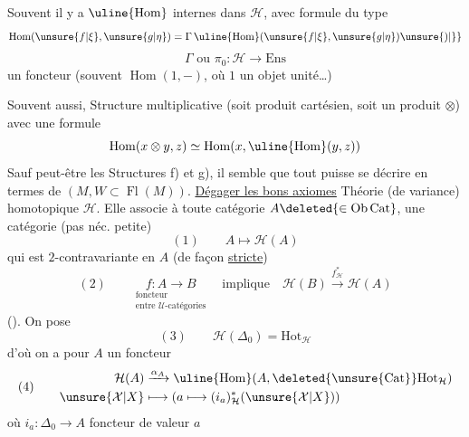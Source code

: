 Souvent il y a  $\uline{\operatorname{Hom}}$ internes
dans $\mathcal H$, avec  formule du type
\[
\operatorname{Hom}(\unsure{f|\xi},\unsure{g|\eta})
=\Gamma\,\uline{\operatorname{Hom}}(\unsure{f|\xi},\unsure{g|\eta})\unsure{)|\}}
\]
\[
\Gamma\text{ ou }\pi_0:\mathcal H\longrightarrow\mathrm{Ens}
\]
un foncteur  (souvent
$\operatorname{Hom}(1,-)$, où $1$ un objet unité\ldots)

Souvent aussi, Structure multiplicative
(soit produit cartésien, soit un produit $\otimes$)
avec une formule
\[
\operatorname{Hom}(x\otimes y,z)\simeq
\operatorname{Hom}(x,\uline{\operatorname{Hom}}(y,z))
\]
Sauf peut-être les Structures
f) et g), il semble que tout puisse
se décrire en termes de $(M,W\subset\operatorname{Fl}(M))$.
\uline{Dégager les bons axiomes}
Théorie (de variance) homotopique $\mathcal H$.
Elle associe à toute  catégorie
$A\deleted{\in\operatorname{Ob}\mathrm{Cat}}$,
une catégorie
(pas néc. petite)
\[
(1)\qquad \boxed{A\longmapsto\mathcal H(A)}
\]
qui est $2$-contravariante en $A$ (de façon \uline{stricte})
\[
(2)\qquad
\underset{\substack{\text{foncteur}\\\text{entre $\mathcal U$-catégories}}}{f:A\longrightarrow B}
\quad\text{implique}\quad
\mathcal H(B)\xrightarrow{f_{\mathcal H}^{*}}\mathcal H(A)
\]
(). On pose
\[
(3)\qquad \mathcal H(\Delta_0)=\mathrm{Hot}_{\mathcal H}
\]
d'où on a pour  $A$ un foncteur
\[
(4)\qquad
\begin{aligned}
\mathcal H(A)&\xrightarrow{\alpha_A}
\uline{\operatorname{Hom}}(A,\deleted{\unsure{\mathrm{Cat}}}\mathrm{Hot}_{\mathcal H})\\
\unsure{\mathcal X|X}&\longmapsto(a\longmapsto(i_a)_{\mathcal H}^{*}(\unsure{\mathcal X|X}))
\end{aligned}
\]
où $i_a:\Delta_0\longrightarrow A$ foncteur de valeur $a$

